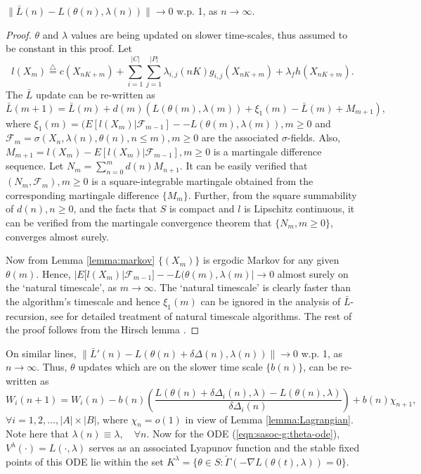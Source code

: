 \documentclass[11pt,letterpaper,english]{article}
\begin{document}
\begin{lemma}
\label{lemma:Lagrangian}
$\|\bar{L}(n) - L(\theta(n), \lambda(n)) \| \rightarrow 0$ w.p. 1, as $n \rightarrow \infty$.

\begin{proof}
{\rm $\theta$ and $\lambda$ values are being updated on slower time-scales, thus assumed to be constant in this proof. Let \[l(X_m) \stackrel{\triangle}{=} c(X_{nK+m}) + \sum\limits_{i=1}^{|C|}\sum\limits_{j=1}^{|P|} \lambda_{i,j}(nK) g_{i,j}(X_{nK+m}) + \lambda_f h(X_{nK+m}).\]
The $\bar{L}$ update can be re-written as
\[\bar{L}(m + 1) = \bar{L}(m) + d(m)\left ( L(\theta(m),\lambda(m)) + \xi_1(m) - \bar{L}(m) + M_{m + 1} \right ), \]
where $\xi_1(m) = (E[ l(X_m) | \mathcal{F}_{m - 1} ] - - L(\theta(m),\lambda(m)), m \ge 0$ and \\$\mathcal{F}_m = \sigma(X_n, \lambda(n), \theta(n), n \le m), m \ge 0$ are the associated $\sigma$-fields. Also, $M_{m + 1} = l(X_m) - E[ l(X_m) | \mathcal{F}_{m - 1} ], m \ge 0$ is a martingale difference sequence. Let $N_m = \sum_{n = 0}^{m} d(n) M_{n + 1}$. It can be easily verified that $(N_m, \mathcal{F}_m), m \ge 0$ is a square-integrable martingale obtained from the corresponding martingale difference $\{M_m\}$. Further, from the square summability of $d(n), n \ge 0$, and the facts that $S$ is compact and $l$ is Lipschitz continuous, it can be verified from the martingale convergence theorem that $\{N_m, m \ge 0\}$, converges almost surely.

Now from Lemma \ref{lemma:markov} $\{(X_m)\}$ is ergodic Markov for any given $\theta(m)$. Hence,
$|E[ l(X_m) | \mathcal{F}_{m - 1} ] - - L(\theta(m),\lambda(m)| \rightarrow 0$ almost surely on the `natural timescale', as $m \rightarrow \infty$.  The `natural timescale' is clearly faster than the algorithm's timescale and hence $\xi_1(m)$ can be ignored in the analysis of $\bar L$-recursion, see \cite[Chapter 6.2]{borkar2008stochastic} for detailed treatment of natural timescale algorithms.
The rest of the proof follows from the Hirsch lemma \cite[Theorem 1, pp. 339]{hirsch1989convergent}.
}
\end{proof}
\end{lemma}

On similar lines, $\|\bar{L}'(n) - L(\theta(n) + \delta \Delta(n), \lambda(n)) \| \rightarrow 0$ w.p. 1, as $n \rightarrow \infty$.  Thus, $\theta$ updates which are on the slower time scale $\{b(n)\}$, can be re-written as
\begin{equation}
W_{i}(n + 1) = W_{i}(n) - b(n) \left ( \frac{L(\theta(n) + \delta \Delta_{i}(n), \lambda) - L(\theta(n), \lambda)}{\delta \Delta_{i}(n)}  \right) + b(n) \chi_{n+1} ,
\label{weq}
\end{equation}
$\forall i = 1, 2, \dots, |A| \times |B|$, where $\chi_n = o(1)$ in view of Lemma \ref{lemma:Lagrangian}. Note here that $\lambda(n) \equiv \lambda, \quad \forall n$.
Now for the ODE (\ref{eqn:sasoc-g:theta-ode}), $V^{\lambda}(\cdot) = L(\cdot,\lambda)$ serves as an associated Lyapunov function and the stable fixed points of this ODE lie within the set $K^{\lambda} = \{ \theta \in S: \check{\Gamma}\left ( -\nabla L(\theta(t), \lambda) \right ) = 0 \}$.
\end{document}
